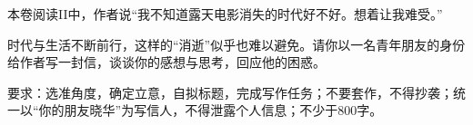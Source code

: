 \documentclass[11pt,a4paper]{ctexart}
\begin{document}

\par\vspace{2.2em}


\par\vspace{2.2em}


\par\vspace{2.2em}



{\ywkai 本卷阅读II中，作者说“我不知道露天电影消失的时代好不好。想着让我难受。”}

时代与生活不断前行，这样的“消逝”似乎也难以避免。请你以一名青年朋友的身份给作者写一封信，谈谈你的感想与思考，回应他的困惑。

要求：选准角度，确定立意，自拟标题，完成写作任务；不要套作，不得抄袭；统一以“你的朋友晓华”为写信人，不得泄露个人信息；不少于800字。
\end{document}

